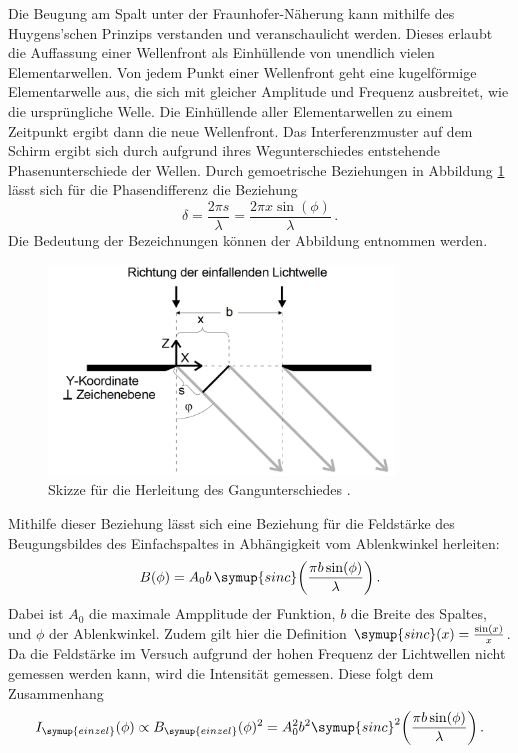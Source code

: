 Die Beugung am Spalt unter der Fraunhofer-Näherung kann mithilfe des Huygens'schen
Prinzips verstanden und veranschaulicht werden. Dieses erlaubt die Auffassung einer
Wellenfront als Einhüllende von unendlich vielen Elementarwellen. Von jedem Punkt
einer Wellenfront geht eine kugelförmige Elementarwelle aus, die sich mit gleicher Amplitude und
Frequenz ausbreitet, wie die ursprüngliche Welle. Die Einhüllende aller Elementarwellen
zu einem Zeitpunkt ergibt dann die neue Wellenfront.
Das Interferenzmuster auf dem Schirm ergibt sich durch aufgrund ihres Wegunterschiedes
entstehende Phasenunterschiede der Wellen. Durch gemoetrische Beziehungen in
Abbildung \ref{fig:gangunterschied} lässt sich für die Phasendifferenz die
Beziehung
\begin{equation}
  \delta = \frac{2\pi s}{\lambda} = \frac{2 \pi x \sin(\phi)}{\lambda} \,.
\end{equation}
Die Bedeutung der Bezeichnungen können der Abbildung entnommen werden.

\begin{figure}
  \centering
  \includegraphics[width=260pt]{data/gangunterschied.png}
  \caption{Skizze für die Herleitung des Gangunterschiedes \cite{Versuchsanleitung}.}
  \label{fig:gangunterschied}
\end{figure}


Mithilfe dieser Beziehung lässt sich eine Beziehung für
die Feldstärke des Beugungsbildes des Einfachspaltes in Abhängigkeit vom Ablenkwinkel herleiten:
\begin{equation}
  B(\phi)= A_0 b \, \symup{sinc}\biggl(\frac{\pi b \sin(\phi)}{\lambda}\biggr) \,.
\end{equation}
Dabei ist $A_0$ die maximale Ampplitude der Funktion, $b$ die Breite des Spaltes,
und $\phi$ der Ablenkwinkel. Zudem gilt hier die Definition $\symup{sinc}(x)=\frac{\sin(x)}{x}$.
Da die Feldstärke im Versuch aufgrund der hohen Frequenz der Lichtwellen nicht gemessen
werden kann, wird die Intensität gemessen. Diese folgt dem Zusammenhang
\begin{equation}
  I_{\symup{einzel}}(\phi) \propto B_{\symup{einzel}}(\phi)^2=A_0^2 b^2 \symup{sinc}^2\biggl(\frac{\pi b \sin(\phi)}{\lambda}\biggr)  \,.
\end{equation}

